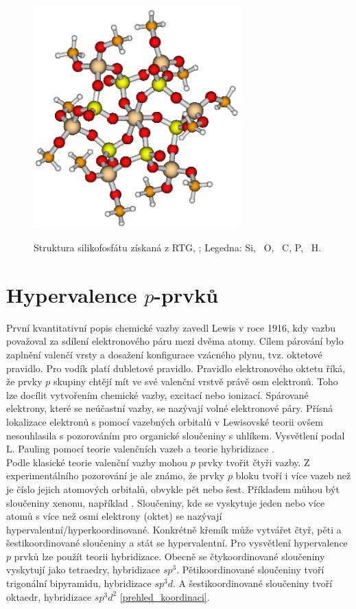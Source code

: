\documentclass[
  digital, %
  table,   %
  lof,     %
  lot,     %
  oneside,
]{fithesis3}
\begin{document}
\begin{figure}
\caption{Struktura silikofosfátu získaná z RTG, \cite{C4TA06823H};  Legedna:  Si, ~O, ~C,  P, ~H. }
\center \includegraphics[width=8cm]{struktura_puvodni.png} \label{rtg_koordinace_sest} \end{figure}

\section{Hypervalence $p$-prvků}
První kvantitativní popis chemické vazby zavedl Lewis v roce 1916, kdy vazbu považoval za sdílení elektronového páru mezi dvěma atomy. Cílem párování bylo zaplnění valenčí vrsty a dosažení konfigurace vzácného plynu, tvz. oktetové pravidlo. Pro vodík platí dubletové pravidlo. Pravidlo elektronového oktetu říká, že  prvky $p$ skupiny chtějí mít ve své valenční vrstvě právě osm elektronů. Toho lze docílit vytvořením chemické vazby, excitací nebo ionizací. Spárované elektrony, které se neúčastní vazby, se nazývají volné elektronové páry. Přísná lokalizace elektronů s pomocí vazebných orbitalů v Lewisovské teorii ovšem nesouhlasila s pozorováním pro organické sloučeniny s uhlíkem. Vysvětlení podal L. Pauling pomocí teorie valenčních vazeb a teorie hybridizace \cite{Munzarova1996thesis}.\\

Podle klasické teorie valenční vazby mohou $p$ prvky tvořit čtyři vazby. Z experimentálního pozorování je ale známo, že prvky $p$ bloku tvoří i více vazeb než je číslo jejich atomových orbitalů, obvykle pět nebo šest. Příkladem můhou být sloučeniny xenonu, například .
Sloučeniny, kde se vyskytuje jeden nebo více atomů s více než osmi elektrony (oktet) se nazývají hypervalentní/hyperkoordinované. Konkrétně křemík může vytvářet čtyř, pěti a šestikoordinované sloučeniny a stát se hypervalentní. Pro vysvětlení hypervalence $p$ prvků lze použít teorii hybridizace. Obecně se čtykoordinované sloučeniny vyskytují jako tetraedry, hybridizace $sp^3$. Pětikoordinované sloučeniny tvoří trigonální bipyramidu, hybridizace $sp^3d$. A šestikoordinované sloučeniny tvoří oktaedr, hybridizace $sp^3d^2$ \ref{prehled_koordinaci}.
\end{document}
